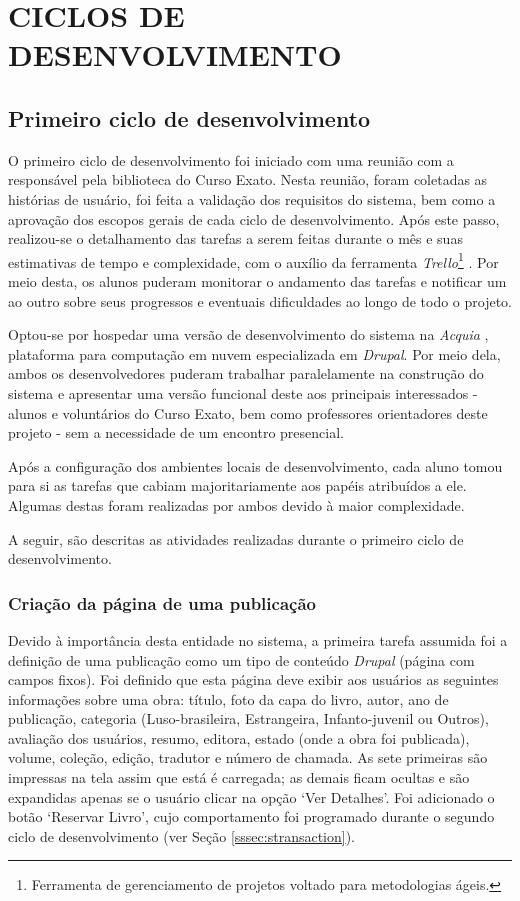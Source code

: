 \documentclass[a4paper]{article}
\begin{document}
\pagebreak
\section{CICLOS DE DESENVOLVIMENTO}
\subsection{Primeiro ciclo de desenvolvimento}

O primeiro ciclo de desenvolvimento foi iniciado com uma reunião com a responsável pela biblioteca do Curso Exato. Nesta reunião, foram coletadas as histórias de usuário, foi feita a validação dos requisitos do sistema, bem como a aprovação dos escopos gerais de cada ciclo de desenvolvimento. Após este passo, realizou-se o detalhamento das tarefas a serem feitas durante o mês e suas estimativas de tempo e complexidade, com o auxílio da ferramenta \textit{Trello}\footnote{Ferramenta de gerenciamento de projetos voltado para metodologias ágeis.} \cite{trello}. Por meio desta, os alunos puderam monitorar o andamento das tarefas e notificar um ao outro sobre seus progressos e eventuais dificuldades ao longo de todo o projeto.

Optou-se por hospedar uma versão de desenvolvimento do sistema na \textit{Acquia} \cite{acquia}, plataforma para computação em nuvem especializada em \textit{Drupal}. Por meio dela, ambos os desenvolvedores puderam trabalhar paralelamente na construção do sistema e apresentar uma versão funcional deste aos principais interessados - alunos e voluntários do Curso Exato, bem como professores orientadores deste projeto - sem a necessidade de um encontro presencial.

Após a configuração dos ambientes locais de desenvolvimento, cada aluno tomou para si as tarefas que cabiam majoritariamente aos papéis atribuídos a ele. Algumas destas foram realizadas por ambos devido à maior complexidade.

A seguir, são descritas as atividades realizadas durante o primeiro ciclo de desenvolvimento.

\subsubsection{Criação da página de uma publicação}

Devido à importância desta entidade no sistema, a primeira tarefa assumida foi a definição de uma publicação como um tipo de conteúdo \textit{Drupal} (página com campos fixos). Foi definido que esta página deve exibir aos usuários as seguintes informações sobre uma obra: título, foto da capa do livro, autor, ano de publicação, categoria (Luso-brasileira, Estrangeira, Infanto-juvenil ou Outros), avaliação dos usuários, resumo, editora, estado (onde a obra foi publicada), volume, coleção, edição, tradutor e número de chamada. As sete primeiras são impressas na tela assim que está é carregada; as demais ficam ocultas e são expandidas apenas se o usuário clicar na opção ‘Ver Detalhes’. Foi adicionado o botão ‘Reservar Livro’, cujo comportamento foi programado durante  o segundo ciclo de desenvolvimento (ver Seção {\ref{sssec:stransaction}}).
\end{document}
